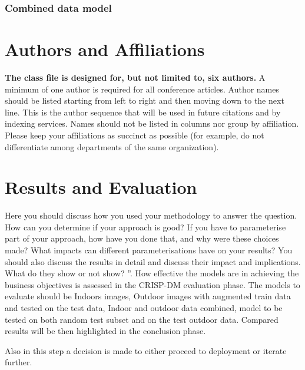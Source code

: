 \documentclass[conference]{IEEEtran}
\begin{document}
\subsubsection{Combined data model}



\section{Authors and Affiliations}
\textbf{The class file is designed for, but not limited to, six authors.} A 
minimum of one author is required for all conference articles. Author names 
should be listed starting from left to right and then moving down to the 
next line. This is the author sequence that will be used in future citations 
and by indexing services. Names should not be listed in columns nor group by 
affiliation. Please keep your affiliations as succinct as possible (for 
example, do not differentiate among departments of the same organization).

\section{Results and Evaluation}
Here you should discuss how you used your methodology to answer the question.  How can you determine if your approach is good?  If you have to parameterise part of your approach, how have you done that, and why were these choices made?  What impacts can different parameterisations have  on  your  results?   You  should  also  discuss  the  results  in  detail  and discuss their impact and implications.  What do they show or not show? ”. 
How effective the models are in achieving the business objectives is assessed in the CRISP-DM evaluation phase. The models to evaluate should be Indoors images, Outdoor images with augmented train data and tested on the test data, Indoor and outdoor data combined, model to be tested on both random test subset and on the test outdoor data. Compared results will be then highlighted in the conclusion phase. 

Also in this step a decision is made to either proceed to deployment or iterate further.  
\end{document}
